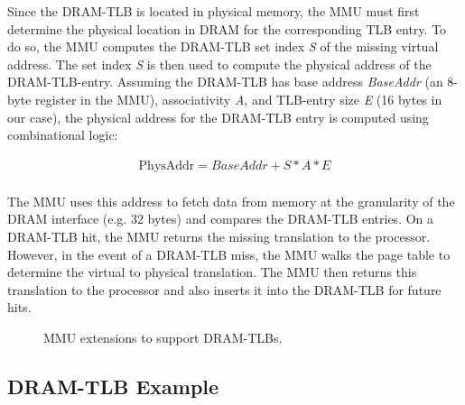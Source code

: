 

Since the DRAM-TLB is located in physical memory, the MMU must first
determine the physical location in DRAM for the corresponding TLB
entry. To do so, the MMU computes the DRAM-TLB set index {\em S} of
the missing virtual address. The set index {\em S} is then used to
compute the physical address of the DRAM-TLB-entry. Assuming the
DRAM-TLB has base address {\em BaseAddr} (an 8-byte register in the
MMU), associativity {\em A}, and TLB-entry size {\em E} (16 bytes in
our case), the physical address for the DRAM-TLB entry is computed
using combinational logic:

\begin{equation}
  \begin{array}{rl}
    \text{PhysAddr} = BaseAddr + S * A * E \\
  \end{array}
\end{equation}

\noindent The MMU uses this address to fetch data from memory at the
granularity of the DRAM interface (e.g. 32 bytes) and compares the
DRAM-TLB entries. On a DRAM-TLB hit, the MMU returns the missing
translation to the processor. However, in the event of a DRAM-TLB
miss, the MMU walks the page table to determine the virtual to
physical translation. The MMU then returns this translation to the
processor and also inserts it into the DRAM-TLB for future hits.

\begin{figure}[tp] 
  \vspace{-0. in} \centering
  \centerline{}

  \caption{\small MMU extensions to support DRAM-TLBs.
    \normalsize}
  \label{fig:mmu_state} 
  \vspace{-0 in}
\end{figure}

\subsection{DRAM-TLB Example}

